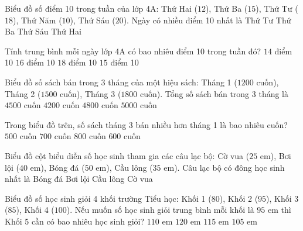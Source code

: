\begin{ex} %
Biểu đồ số điểm 10 trong tuần của lớp 4A: Thứ Hai ($12$), Thứ Ba ($15$), Thứ Tư ($18$), Thứ Năm ($10$), Thứ Sáu ($20$). Ngày có nhiều điểm 10 nhất là
\choice
{Thứ Tư}
{Thứ Ba}
{\True Thứ Sáu}
{Thứ Hai}
\end{ex}

\begin{ex} %
Tính trung bình mỗi ngày lớp 4A có bao nhiêu điểm 10 trong tuần đó?
\choice
{$14$ điểm 10}
{$16$ điểm 10}
{$18$ điểm 10}
{\True $15$ điểm 10}
\end{ex}

\begin{ex} %
Biểu đồ số sách bán trong 3 tháng của một hiệu sách: Tháng 1 ($1200\text{ cuốn}$), Tháng 2 ($1500\text{ cuốn}$), Tháng 3 ($1800\text{ cuốn}$). Tổng số sách bán trong 3 tháng là
\choice
{\True $4500\text{ cuốn}$}
{$4200\text{ cuốn}$}
{$4800\text{ cuốn}$}
{$5000\text{ cuốn}$}
\end{ex}

\begin{ex} %
Trong biểu đồ trên, số sách tháng 3 bán nhiều hơn tháng 1 là bao nhiêu cuốn?
\choice
{$500$ cuốn}
{$700$ cuốn}
{$800$ cuốn}
{\True $600$ cuốn}
\end{ex}

\begin{ex} %
Biểu đồ cột biểu diễn số học sinh tham gia các câu lạc bộ: Cờ vua ($25\text{ em}$), Bơi lội ($40\text{ em}$), Bóng đá ($50\text{ em}$), Cầu lông ($35\text{ em}$). Câu lạc bộ có đông học sinh nhất là
\choice
{\True Bóng đá}
{Bơi lội}
{Cầu lông}
{Cờ vua}
\end{ex}

\begin{ex} %
Biểu đồ số học sinh giỏi 4 khối trường Tiểu học: Khối 1 ($80$), Khối 2 ($95$), Khối 3 ($85$), Khối 4 ($100$). Nếu muốn số học sinh giỏi trung bình mỗi khối là $95$ em thì Khối 5 cần có bao nhiêu học sinh giỏi?
\choice
{$110$ em}
{$120$ em}
{\True $115$ em}
{$105$ em}
\end{ex}

